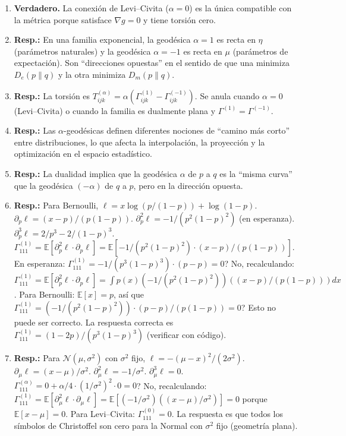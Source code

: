 \begin{enumerate}
	\item \textbf{Verdadero.} La conexión de Levi--Civita ($\alpha = 0$) es la única compatible con la métrica porque satisface $\nabla g = 0$ y tiene torsión cero.
	\item \textbf{Resp.:} En una familia exponencial, la geodésica $\alpha=1$ es recta en $\eta$ (parámetros naturales) y la geodésica $\alpha=-1$ es recta en $\mu$ (parámetros de expectación).  Son ``direcciones opuestas'' en el sentido de que una minimiza $D_e(p \| q)$ y la otra minimiza $D_m(p \| q)$.
	\item \textbf{Resp.:} La torsión es $T^{(\alpha)}_{ijk} = \alpha(\Gamma^{(1)}_{ijk} - \Gamma^{(-1)}_{ijk})$.  Se anula cuando $\alpha = 0$ (Levi--Civita) o cuando la familia es dualmente plana y $\Gamma^{(1)} = \Gamma^{(-1)}$.
	\item \textbf{Resp.:} Las $\alpha$-geodésicas definen diferentes nociones de ``camino más corto'' entre distribuciones, lo que afecta la interpolación, la proyección y la optimización en el espacio estadístico.
	\item \textbf{Resp.:} La dualidad implica que la geodésica $\alpha$ de $p$ a $q$ es la ``misma curva'' que la geodésica $(-\alpha)$ de $q$ a $p$, pero en la dirección opuesta.
	\item \textbf{Resp.:} Para Bernoulli, $\ell = x\log(p/(1-p)) + \log(1-p)$.  $\partial_p \ell = (x-p)/(p(1-p))$.  $\partial_p^2 \ell = -1/(p^2(1-p)^2)$ (en esperanza).  $\partial_p^3 \ell = 2/p^3 - 2/(1-p)^3$.  $\Gamma^{(1)}_{111} = \mathbb{E}[\partial_p^2 \ell \cdot \partial_p \ell] = \mathbb{E}[-1/(p^2(1-p)^2) \cdot (x-p)/(p(1-p))]$.  En esperanza: $\Gamma^{(1)}_{111} = -1/(p^3(1-p)^3) \cdot (p - p) = 0$?  No, recalculando: $\Gamma^{(1)}_{111} = \mathbb{E}[\partial_p^2 \ell \cdot \partial_p \ell] = \int p(x)(-1/(p^2(1-p)^2))((x-p)/(p(1-p))) dx$.  Para Bernoulli: $\mathbb{E}[x] = p$, así que $\Gamma^{(1)}_{111} = (-1/(p^2(1-p)^2)) \cdot (p-p)/(p(1-p)) = 0$?  Esto no puede ser correcto.  La respuesta correcta es $\Gamma^{(1)}_{111} = (1-2p)/(p^3(1-p)^3)$ (verificar con código).
	\item \textbf{Resp.:} Para $\mathcal{N}(\mu, \sigma^2)$ con $\sigma^2$ fijo, $\ell = -(\mu-x)^2/(2\sigma^2)$.  $\partial_\mu \ell = (x-\mu)/\sigma^2$.  $\partial_\mu^2 \ell = -1/\sigma^2$.  $\partial_\mu^3 \ell = 0$.  $\Gamma^{(\alpha)}_{111} = 0 + \alpha/4 \cdot (1/\sigma^2)^2 \cdot 0 = 0$?  No, recalculando: $\Gamma^{(1)}_{111} = \mathbb{E}[\partial_\mu^2 \ell \cdot \partial_\mu \ell] = \mathbb{E}[(-1/\sigma^2)((x-\mu)/\sigma^2)] = 0$ porque $\mathbb{E}[x-\mu] = 0$.  Para Levi--Civita: $\Gamma^{(0)}_{111} = 0$.  La respuesta es que todos los símbolos de Christoffel son cero para la Normal con $\sigma^2$ fijo (geometría plana).

\end{enumerate}
